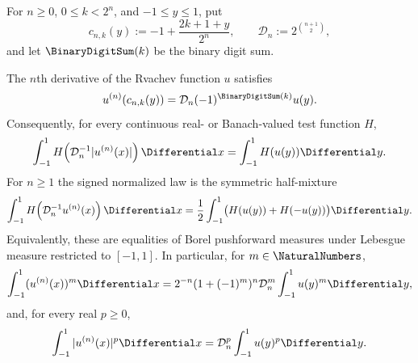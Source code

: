 For $n\ge0$, $0\le k<2^n$, and $-1\le y\le1$, put
\[
 c_{n,k}(y):=-1+\frac{2k+1+y}{2^n},
 \qquad \mathcal D_n:=2^{\binom{n+1}{2}},
\]
and let $\BinaryDigitSum(k)$ be the binary digit sum.

\begin{theorem}
\label{rvd:thm:derivative-distribution}
The $n$th derivative of the Rvachev function $u$ satisfies
\begin{equation}
 u^{(n)}(c_{n,k}(y))=\mathcal D_n(-1)^{\BinaryDigitSum(k)}u(y).
 \label{rvd:eq:cell-tiling}
\end{equation}
Consequently, for every continuous real- or Banach-valued test function $H$,
\begin{equation}
 \int_{-1}^{1}H\!\left(\mathcal D_n^{-1}|u^{(n)}(x)|\right)\Differential x
 =\int_{-1}^{1}H(u(y))\Differential y.
 \label{rvd:eq:absolute-law}
\end{equation}
For $n\ge1$ the signed normalized law is the symmetric half-mixture
\begin{equation}
 \int_{-1}^{1}H\!\left(\mathcal D_n^{-1}u^{(n)}(x)\right)\Differential x
 =\frac12\int_{-1}^{1}\bigl(H(u(y))+H(-u(y))\bigr)\Differential y.
 \label{rvd:eq:signed-law}
\end{equation}
Equivalently, these are equalities of Borel pushforward measures under
Lebesgue measure restricted to $[-1,1]$.  In particular, for $m\in\NaturalNumbers$,
\begin{equation}
 \int_{-1}^{1}(u^{(n)}(x))^m\Differential x
 =2^{-n}(1+(-1)^m)^n\mathcal D_n^m
  \int_{-1}^{1}u(y)^m\Differential y,
 \label{rvd:eq:signed-moments}
\end{equation}
and, for every real $p\ge0$,
\begin{equation}
 \int_{-1}^{1}|u^{(n)}(x)|^p\Differential x
 =\mathcal D_n^p\int_{-1}^{1}u(y)^p\Differential y.
 \label{rvd:eq:absolute-moments}
\end{equation}
\end{theorem}

